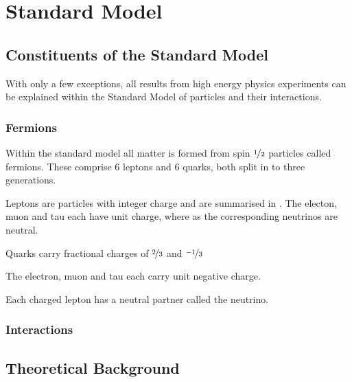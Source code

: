 \chapter{Standard Model}




\section{Constituents of the Standard Model}
With only a few exceptions, all results from high energy physics experiments can
be explained within the Standard Model of particles and their interactions.

\subsection{Fermions}
Within the standard model all matter is formed from spin $\nicefrac{1}{2}$
particles called fermions.
These comprise 6 leptons and 6 quarks, both split in to three generations.

Leptons are particles with integer charge and are summarised in \TableRef{}. The
electon, muon and tau each have unit charge, where as the corresponding
neutrinos are neutral.

Quarks carry fractional charges of $\nicefrac{2}{3}$ and $\nicefrac{-1}{3}$



The electron, muon and tau each carry unit negative charge. 

Each charged lepton has a neutral partner called the neutrino. 

\subsection{Interactions}

\section{Theoretical Background}

